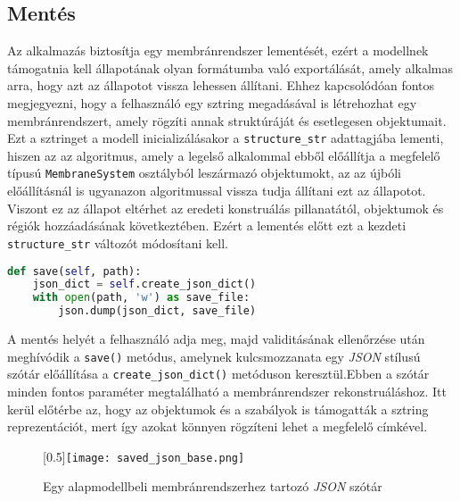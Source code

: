\subsection{Mentés}
Az alkalmazás biztosítja egy membránrendszer lementését, ezért a modellnek támogatnia kell állapotának olyan formátumba való exportálását, amely alkalmas arra, hogy azt az állapotot vissza lehessen állítani. Ehhez kapcsolódóan fontos megjegyezni, hogy a felhasználó egy sztring megadásával is létrehozhat egy membránrendszert, amely rögzíti annak struktúráját és esetlegesen objektumait. Ezt a sztringet a modell inicializálásakor a \verb|structure_str| adattagjába lementi, hiszen az az algoritmus, amely a legelső alkalommal ebből előállítja a megfelelő típusú \verb|MembraneSystem| osztályból leszármazó objektumokt, az az újbóli előállításnál is ugyanazon algoritmussal vissza tudja állítani ezt az állapotot. Viszont ez az állapot eltérhet az eredeti konstruálás pillanatától, objektumok és régiók hozzáadásának következtében. Ezért a lementés előtt ezt a kezdeti \verb|structure_str| változót módosítani kell. 	

\begin{lstlisting}[language={Python}]
def save(self, path):
	json_dict = self.create_json_dict()
	with open(path, 'w') as save_file:
		json.dump(json_dict, save_file)
\end{lstlisting}

A mentés helyét a felhasználó adja meg, majd  validitásának ellenőrzése után meghívódik a \verb|save()| metódus, amelynek kulcsmozzanata egy \textit{JSON} stílusú szótár előállítása a \verb|create_json_dict()| metóduson keresztül.Ebben a szótár minden fontos paraméter megtalálható a membránrendszer rekonstruáláshoz. Itt kerül előtérbe az, hogy az objektumok és a szabályok is támogatták a sztring reprezentációt, mert így azokat könnyen rögzíteni lehet a megfelelő címkével. 

\begin{figure}[H]
\centering
	\scalebox{0.5}[0.5]{\texttt{[image: saved\_json\_base.png]}}
	\caption{Egy alapmodellbeli membránrendszerhez tartozó \textit{JSON} szótár}
	\label{fig:save_model_base}
\end{figure}

